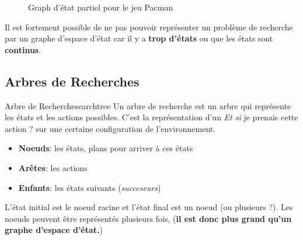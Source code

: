 \begin{figure}[H]
    \begin{center}
    \end{center}
    \caption{Graph d'état partiel pour le jeu Pacman}\label{fig:stategraph}
\end{figure}


\begin{remark}\leavevmode
    Il est fortement possible de ne pas pouvoir représenter un problème de recherche par un graphe d'espace d'état car 
    il y a \textbf{trop d'états} ou que les états sont \textbf{continus}.
\end{remark}


\subsection{Arbres de Recherches} %
\label{sub:arbres_de_recherches}

\begin{definition}{Arbre de Recherche}{searchtree}
    Un arbre de recherche est un arbre qui représente les états et les actions possibles.
    C'est la représentation d'un \textit{Et si} je prenais cette action ? sur une certaine configuration de l'environnement.
    \begin{itemize}
        \item \textbf{Noeuds}: les états, plans pour arriver à ces états
        \item \textbf{Arêtes}: les actions
        \item \textbf{Enfants}: les états suivants (\textit{succeseurs})
    \end{itemize} 
    L'état initial est le noeud racine et l'état final est un noeud (ou plusieurs ?). 
    Les noeuds peuvent être représentés plusieurs fois, (\textbf{il est donc plus grand qu'un graphe d'espace d'état.})
\end{definition}


